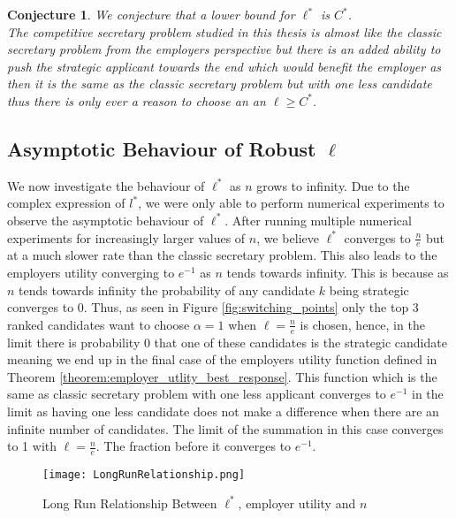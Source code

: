 \documentclass{article}
\newtheorem{conjecture}{Conjecture}
\begin{document}
\begin{conjecture}\label{conjecture:l*_upper_bound}
    We conjecture that a lower bound for $\ell^*$ is $C^*$. \\
    The competitive secretary problem studied in this thesis is almost like the classic secretary problem from the employers perspective but there is an added ability to push the strategic applicant towards the end which would benefit the employer as then it is the same as the classic secretary problem but with one less candidate thus there is only ever a reason to choose an an $\ell \geq C^*$. 
\end{conjecture}

\subsection{Asymptotic Behaviour of Robust \texorpdfstring{$\ell$}{l}}

We now investigate the behaviour of $\ell^*$ as $n$ grows to infinity. Due to the complex expression of $l^*$, we were only able to perform numerical experiments to observe the asymptotic behaviour of $\ell^*$. After running multiple numerical experiments for increasingly larger values of $n$, we believe $\ell^*$ converges to $\frac{n}{e}$ but at a much slower rate than the classic secretary problem. This also leads to the employers utility converging to $e^{-1}$ as $n$ tends towards infinity. This is because as $n$ tends towards infinity the probability of any candidate $k$ being strategic converges to 0. Thus, as seen in Figure \ref{fig:switching_points} only the top 3 ranked candidates want to choose $\alpha=1$ when $\ell=\frac{n}{e}$ is chosen, hence, in the limit there is probability 0 that one of these candidates is the strategic candidate meaning we end up in the final case of the employers utility function defined in Theorem \ref{theorem:employer_utlity_best_response}. This function which is the same as classic secretary problem with one less applicant converges to $e^{-1}$ in the limit as having one less candidate does not make a difference when there are an infinite number of candidates. The limit of the summation in this case converges to 1 with $\ell=\frac{n}{e}$. The fraction before it converges to $e^{-1}$.

\begin{figure}[H]
\centering
\centering
\texttt{[image: LongRunRelationship.png]}
\caption{Long Run Relationship Between $\ell^*$, employer utility and $n$}
\label{fig:N-grows}
\end{figure}
\end{document}
